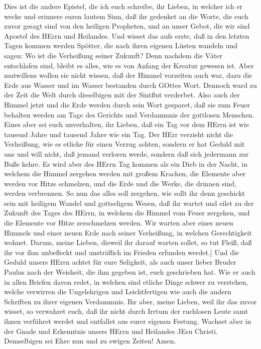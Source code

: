  Dies ist die andere Epistel, die ich euch schreibe, ihr
Lieben, in welcher ich er wecke und erinnere euren lautem Sinn,
 daß ihr gedenket an die Worte, die euch zuvor gesagt sind
von den heiligen Propheten, und an unser Gebot, die wir sind Apostel des
HErrn und Heilandes.  Und wisset das aufs erste, daß in den
letzten Tagen kommen werden Spötter, die nach ihren eigenen Lüsten
wandeln  und sagen: Wo ist die Verheißung seiner Zukunft?
Denn nachdem die Väter entschlafen sind, bleibt es alles, wie es von
Anfang der Kreatur gewesen ist.  Aber mutwillens wollen sie
nicht wissen, daß der Himmel vorzeiten auch war, dazu die Erde aus
Wasser und im Wasser bestanden durch GOttes Wort.  Dennoch
ward zu der Zeit die Welt durch dieselbigen mit der Sintflut verderbet.
 Also auch der Himmel jetzt und die Erde werden durch sein
Wort gesparet, daß sie zum Feuer behalten werden am Tage des Gerichts
und Verdammnis der gottlosen Menschen.  Eines aber sei euch
unverhalten, ihr Lieben, daß ein Tag vor dem HErrn ist wie tausend Jahre
und tausend Jahre wie ein Tag.  Der HErr verzieht nicht die
Verheißung, wie es etliche für einen Verzug achten, sondern er hat
Geduld mit uns und will nicht, daß jemand verloren werde, sondern daß
sich jedermann zur Buße kehre.  Es wird aber des HErrn Tag
kommen als ein Dieb in der Nacht, in welchem die Himmel zergehen werden
mit großem Krachen, die Elemente aber werden vor Hitze schmelzen, und
die Erde und die Werke, die drinnen sind, werden verbrennen.
 So nun das alles soll zergehen, wie sollt ihr denn
geschickt sein mit heiligem Wandel und gottseligem Wesen, 
daß ihr wartet und eilet zu der Zukunft des Tages des HErrn, in welchem
die Himmel vom Feuer zergehen, und die Elemente vor Hitze zerschmelzen
werden.  Wir warten aber eines neuen Himmels und einer
neuen Erde nach seiner Verheißung, in welchen Gerechtigkeit wohnet.
 Darum, meine Lieben, dieweil ihr darauf warten sollet, so
tut Fleiß, daß ihr vor ihm unbefleckt und unsträflich im Frieden
erfunden werdet.{]}  Und die Geduld unsers HErrn achtet für
eure Seligkeit, als auch unser lieber Bruder Paulus nach der Weisheit,
die ihm gegeben ist, euch geschrieben hat.  Wie er auch in
allen Briefen davon redet, in welchen sind etliche Dinge schwer zu
verstehen, welche verwirren die Ungelehrigen und Leichtfertigen wie auch
die andern Schriften zu ihrer eigenen Verdammnis.  Ihr
aber, meine Lieben, weil ihr das zuvor wisset, so verwahret euch, daß
ihr nicht durch Irrtum der ruchlosen Leute samt ihnen verführet werdet
und entfallet aus eurer eigenen Festung.  Wachset aber in
der Gnade und Erkenntnis unsers HErrn und Heilandes JEsu Christi.
Demselbigen sei Ehre nun und zu ewigen Zeiten! Amen.
